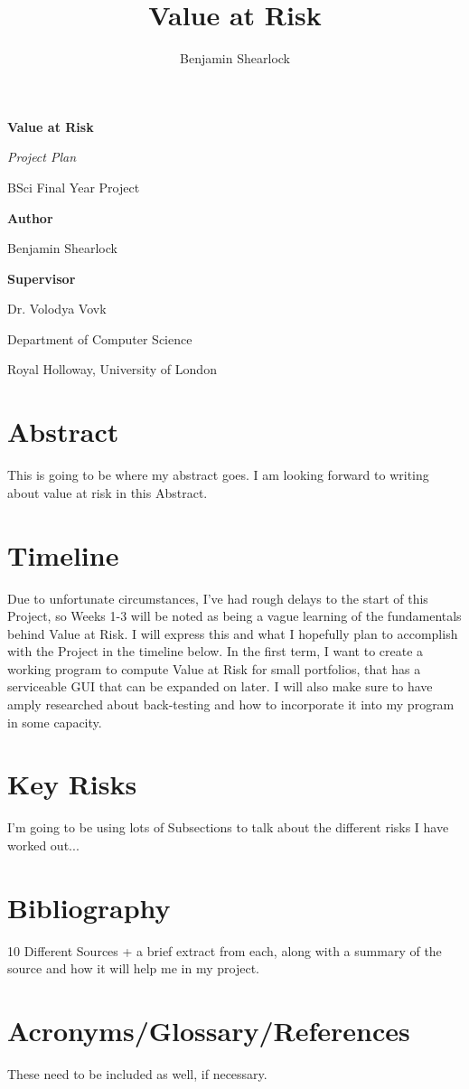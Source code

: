 \documentclass{article}
\title{Value at Risk}
\author{Benjamin Shearlock}
\begin{document}
\begin{titlepage}
  \begin{center}
    \vspace*{1cm}
    {\LARGE \textbf{Value at Risk} \par} 
    \vspace{1.5cm}
    {\Large \textit{Project Plan} \par} 
    \vspace{0.5cm}
    {\Large BSci Final Year Project \par}
    \vspace{2cm}
    {\large \textbf{Author} \par}
    {\large Benjamin Shearlock \par}
    \vspace{2cm}
    {\large \textbf{Supervisor} \par}
    {\large Dr. Volodya Vovk \par}
    \vfill
    {\large Department of Computer Science \par}
    {\large Royal Holloway, University of London \par}
  \end{center}
\end{titlepage}


\section{Abstract}
This is going to be where my abstract goes. I am looking forward to writing about value at risk in this Abstract.

\section{Timeline}
Due to unfortunate circumstances, I've had rough delays to the start of this Project, so Weeks 1-3 will be noted as being a vague learning of the fundamentals behind Value at Risk. I will express this and what I hopefully plan to accomplish with the Project in the timeline below. In the first term, I want to create a working program to compute Value at Risk for small portfolios, that has a serviceable GUI that can be expanded on later. I will also make sure to have amply researched about back-testing and how to incorporate it into my program in some capacity. 

\section{Key Risks}
I'm going to be using lots of Subsections to talk about the different risks I have worked out...

\section{Bibliography}
10 Different Sources + a brief extract from each, along with a summary of the source and how it will help me in my project.

\section{Acronyms/Glossary/References}
These need to be included as well, if necessary.
\end{document}
